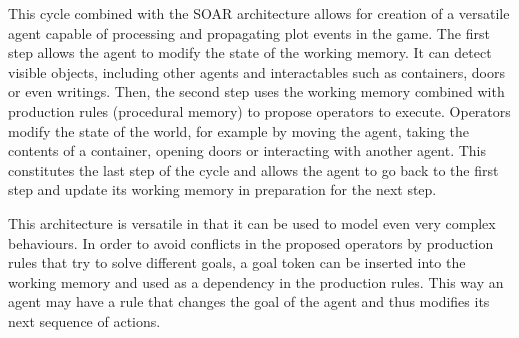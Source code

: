 This cycle combined with the SOAR architecture allows for creation of a versatile agent capable of processing and propagating plot events in the game.
The first step allows the agent to modify the state of the working memory.
It can detect visible objects, including other agents and interactables such as containers, doors or even writings.
Then, the second step uses the working memory combined with production rules (procedural memory) to propose operators to execute.
Operators modify the state of the world, for example by moving the agent, taking the contents of a container, opening doors or interacting with another agent.
This constitutes the last step of the cycle and allows the agent to go back to the first step and update its working memory in preparation for the next step.

This architecture is versatile in that it can be used to model even very complex behaviours.
In order to avoid conflicts in the proposed operators by production rules that try to solve different goals, a goal token can be inserted into the working memory and used as a dependency in the production rules.
This way an agent may have a rule that changes the goal of the agent and thus modifies its next sequence of actions.



